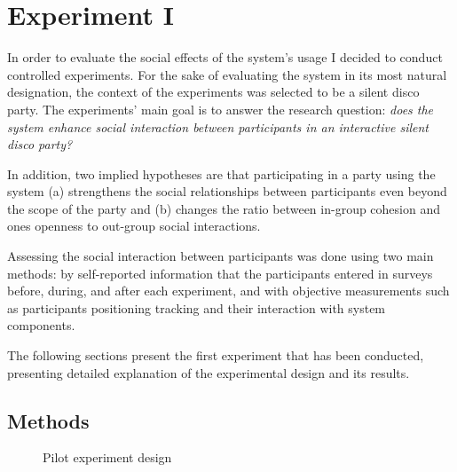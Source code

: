 \documentclass[a4paper,11pt]{article}
\begin{document}
{\section{Experiment I}

In order to evaluate the social effects of the system's usage I decided to conduct controlled experiments.
For the sake of evaluating the system in its most natural designation, the context of the experiments was selected to be a silent disco party.
The experiments' main goal is to answer the research question: \emph{does the system enhance social interaction between participants in an interactive silent disco party?}

In addition, two implied hypotheses are that participating in a party using the system (a) strengthens the social relationships between participants even beyond the scope of the party and (b) changes the ratio between in-group cohesion and ones openness to out-group social interactions.

Assessing the social interaction between participants was done using two main methods: by self-reported information that the participants entered in surveys before, during, and after each experiment, and with objective measurements such as participants positioning tracking and their interaction with system components.

The following sections present the first experiment that has been conducted, presenting detailed explanation of the experimental design and its results.

\subsection{Methods}

\begin{figure}[!htb]
	\centering
	\def\svgwidth{0.95\columnwidth}
  	
	\caption{Pilot experiment design}\label{fig:pilot}
\end{figure}

}
\end{document}

